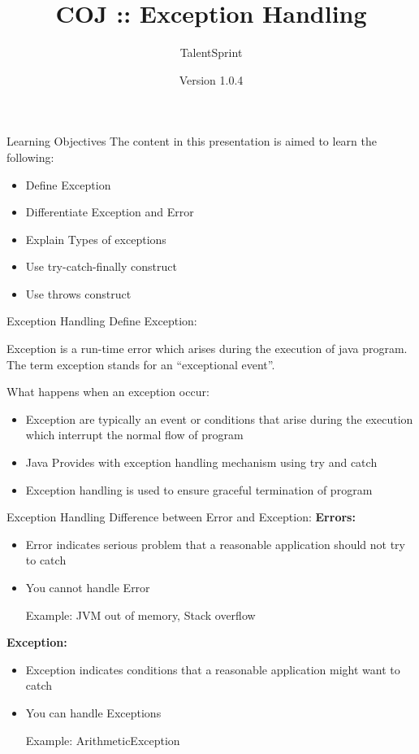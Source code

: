 \documentclass[14pt]{beamer}
\title[COJ:Java:01]{COJ :: Exception Handling}
\author[TS]{TalentSprint}
\institute[L\&D]{Licensed To Skill}
\date{Version 1.0.4}
\begin{document}
\begin{frame}
  \titlepage
\end{frame}

\begin{frame}{Learning Objectives}
The content in this presentation is aimed to learn the following:
  \begin{itemize}
  \item Define Exception
  \item Differentiate Exception and Error
  \item Explain Types of exceptions
  \item Use try-catch-finally construct
  \item Use throws construct
 
 \end{itemize}
\end{frame}

\begin{frame}{Exception Handling}
 Define Exception:
 
Exception is a run-time error which arises during the execution of java program. The term exception stands for an ``exceptional event''.

What happens when an exception occur:
\begin{itemize}
 \item Exception are typically an event or conditions that arise during the execution which interrupt the normal flow of program
 \item Java Provides with exception handling mechanism using try and catch
 \item Exception handling is used to ensure graceful termination of program
\end{itemize}
\end{frame}

\begin{frame}{Exception Handling}
 Difference between Error and Exception:
 \textbf{Errors:}
 \begin{itemize}
  \item Error indicates serious problem that a reasonable application should not try to catch
  \item You cannot handle Error
  
 Example: JVM out of memory, Stack overflow
 \end{itemize}
\textbf{Exception:}
 \begin{itemize}
  \item Exception indicates conditions that a reasonable application might want to catch
  \item You can handle Exceptions
  
  Example: ArithmeticException
 \end{itemize}
\end{frame}
\end{document}
